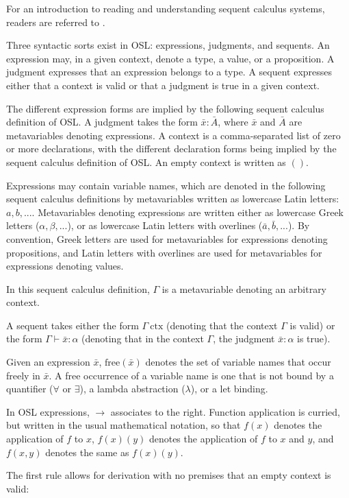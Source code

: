 \documentclass[11pt]{article}
\begin{document}
For an introduction to reading and understanding sequent
calculus systems, readers are referred to \cite{sequent-calculus}.

Three syntactic sorts exist in OSL: expressions,
judgments, and sequents. An expression may, in a given context,
denote a type, a value, or a proposition.
A judgment expresses that an expression belongs to a type.
A sequent expresses either that a context is valid or
that a judgment is true in a given context.

The different expression forms are implied by the following sequent calculus
definition of OSL. A judgment takes the form $\bar{x} : \bar{A}$,
where $\bar{x}$ and $\bar{A}$ are metavariables denoting
expressions. A context is a comma-separated list of zero or
more declarations, with the different declaration forms being
implied by the sequent calculus definition of OSL. An empty
context is written as $()$.

Expressions may contain variable names, which
are denoted in the following sequent calculus definitions by
metavariables written as lowercase Latin letters: $a, b, ...$.
Metavariables denoting expressions are written either as
lowercase Greek letters ($\alpha, \beta, ...$), or as
lowercase Latin letters with overlines ($\bar{a}, \bar{b}, ...$).
By convention, Greek letters are used for metavariables
for expressions denoting propositions, and Latin letters with overlines
are used for metavariables for expressions denoting values.

In this sequent calculus definition, $\Gamma$ is a
metavariable denoting an arbitrary context.

A sequent takes either the form $\Gamma\ \text{ctx}$ (denoting
that the context $\Gamma$ is valid)
or the form $\Gamma \vdash \bar{x} : \alpha$ (denoting that in the
context $\Gamma$, the judgment $\bar{x} : \alpha$ is true).

Given an expression $\bar{x}$, $\text{free}(\bar{x})$ denotes
the set of variable names that occur freely in $\bar{x}$. A free
occurrence of a variable name is one that is not bound by a
quantifier ($\forall$ or $\exists$), a lambda abstraction ($\lambda$),
or a let binding.

In OSL expressions, $\to$ associates to the right.
Function application is curried, but written in the usual mathematical
notation, so that $f(x)$ denotes the application of $f$ to $x$,
$f(x)(y)$ denotes the application of $f$ to $x$ and $y$,
and $f(x, y)$ denotes the same as $f(x)(y)$.

The first rule allows for derivation with no premises that an
empty context is valid:
\end{document}
